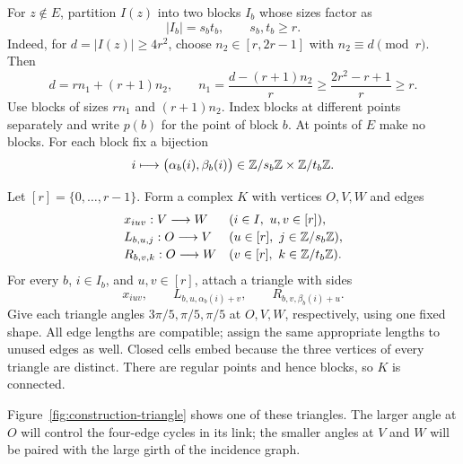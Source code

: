 For $z\notin E$, partition $I(z)$ into two blocks $I_b$ whose sizes factor as
\[
 |I_b|=s_b t_b,\qquad s_b,t_b\ge r.
\]
Indeed, for $d=|I(z)|\ge4r^2$, choose $n_2\in[r,2r-1]$ with $n_2\equiv d\pmod r$. Then
\[
 d=r n_1+(r+1)n_2,\qquad
 n_1=\frac{d-(r+1)n_2}{r}\ge\frac{2r^2-r+1}{r}\ge r.
\]
Use blocks of sizes $r n_1$ and $(r+1)n_2$. Index blocks at different points separately and write $p(b)$ for the point of block $b$. At points of $E$ make no blocks. For each block fix a bijection
\begin{equation}\label{eq:block-coordinates}
 i\longmapsto\bigl(\alpha_b(i),\beta_b(i)\bigr)
 \in\mathbb Z/s_b\mathbb Z\times\mathbb Z/t_b\mathbb Z.
\end{equation}

Let $[r]=\{0,\ldots,r-1\}$. Form a complex $K$ with vertices $O,V,W$ and edges
\[
\begin{array}{ll}
 x_{iuv}:V\longrightarrow W & (i\in I,\ u,v\in[r]),\\[2pt]
 L_{b,u,j}:O\longrightarrow V & (u\in[r],\ j\in\mathbb Z/s_b\mathbb Z),\\[2pt]
 R_{b,v,k}:O\longrightarrow W & (v\in[r],\ k\in\mathbb Z/t_b\mathbb Z).
\end{array}
\]
For every $b$, $i\in I_b$, and $u,v\in[r]$, attach a triangle with sides
\begin{equation}\label{eq:triangle-sides}
 x_{iuv},\qquad L_{b,u,\alpha_b(i)+v},\qquad
 R_{b,v,\beta_b(i)+u}.
\end{equation}
Give each triangle angles $3\pi/5,\pi/5,\pi/5$ at $O,V,W$, respectively, using one fixed shape. All edge lengths are compatible; assign the same appropriate lengths to unused edges as well. Closed cells embed because the three vertices of every triangle are distinct. There are regular points and hence blocks, so $K$ is connected.

Figure~\ref{fig:construction-triangle} shows one of these triangles.
The larger angle at $O$ will control the four-edge cycles in its link;
the smaller angles at $V$ and $W$ will be paired with the large girth of
the incidence graph.

